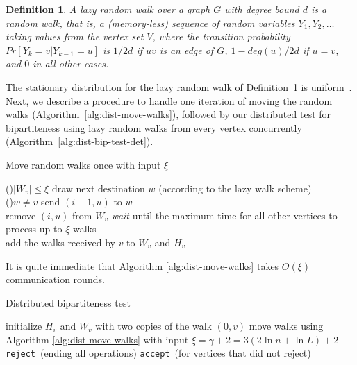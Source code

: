 \documentclass[11pt]{article}
\newtheorem{definition}[theorem]{Definition}
\newcommand{\accept}{\texttt{accept}}
\newcommand{\reject}{\texttt{reject}}
\begin{document}
\begin{definition}
\label{def:lazy-rw}
A {\em lazy} random walk over a graph $G$ with degree bound $d$ is a random walk, that is, a (memory-less) sequence of random variables $Y_1,Y_2,\ldots$ taking values from the vertex set $V$, where the transition probability $Pr[Y_k=v|Y_{k-1}=u]$ is $1/2d$ if $uv$ is an edge of $G$, $1-deg(u)/2d$ if $u=v$, and $0$ in all other cases.
\end{definition}
The stationary distribution for the lazy random walk of Definition~\ref{def:lazy-rw} is uniform~\cite[Section 8]{ron2010algorithmic}.
Next, we describe a procedure to handle one iteration of moving the random walks (Algorithm~\ref{alg:dist-move-walks}), followed by our distributed test for bipartiteness using lazy random walks from every vertex concurrently (Algorithm~\ref{alg:dist-bip-test-det}).
		
\begin{algorithm}[htbp]
\caption{Move random walks once with input $\xi$\label{alg:dist-move-walks}}
{
    \If(){$|W_v|\leq\xi$}
    {
        {
            draw next destination $w$ (according to the lazy walk scheme)\\
			\If(){$w\neq v$}
            {
				send $(i+1,u)$ to $w$\\
				remove $(i,u)$ from $W_v$
			}
		}
	}
    {\em wait} until the maximum time for all other vertices to process up to $\xi$ walks\\
	add the walks received by $v$ to $W_v$ and $H_v$ 
}
\end{algorithm}

It is quite immediate that Algorithm \ref{alg:dist-move-walks} takes $O(\xi)$ communication rounds.
		
\begin{algorithm}[htbp]
\caption{Distributed bipartiteness test\label{alg:dist-bip-test-det}}
{
    {
        initialize $H_v$ and $W_v$ with two copies of the walk $(0,v)$
    }
    {
        move walks using Algorithm \ref{alg:dist-move-walks} with input $\xi=\gamma+2=3(2\ln{n}+\ln{L})+2$
    }
    {
        {
            \reject ~(ending all operations) 
        }
    }
}
\accept ~(for vertices that did not reject)
\end{algorithm}
\end{document}
